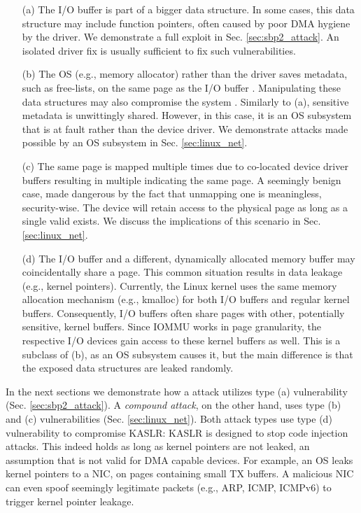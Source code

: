 \begin{enumerate}
    \item[(a)] The I/O buffer is part of a bigger data structure. In some cases, this data structure may include function pointers, often caused by poor DMA hygiene by the driver. We demonstrate a full exploit in Sec. \ref{sec:sbp2_attack}. An isolated driver fix is usually sufficient to fix such vulnerabilities.
    \item[(b)] The OS (e.g., memory allocator) rather than the driver saves metadata, such as free-lists, on the same page as the I/O buffer \cite{Cor07}. Manipulating these data structures may also compromise the system \cite{ak09}. Similarly to (a), sensitive metadata is unwittingly shared. However, in this case, it is an OS subsystem that is at fault rather than the device driver. We demonstrate attacks made possible by an OS subsystem in Sec. \ref{sec:linux_net}.
    \item[(c)] The same page is mapped multiple times due to co-located device driver buffers resulting in multiple \iova{} indicating the same page. A seemingly benign case, made dangerous by the fact that unmapping one \iova{} is meaningless, security-wise. The device will retain access to the physical page as long as a single valid \iova{} exists. We discuss the implications of this scenario in Sec. \ref{sec:linux_net}.
    \item[(d)] The I/O buffer and a different, dynamically allocated memory buffer may coincidentally share a page. This common situation results in data leakage (e.g., kernel pointers). Currently, the Linux kernel uses the same memory allocation mechanism (e.g., kmalloc) for both I/O buffers and regular kernel buffers. Consequently, I/O buffers often share pages with other, potentially sensitive, kernel buffers. Since IOMMU works in page granularity, the respective I/O devices gain access to these kernel buffers as well. This is a subclass of (b), as an OS subsystem causes it, but the main difference is that the exposed data structures are leaked randomly.

\end{enumerate}

In the next sections we demonstrate how a \simple{} attack utilizes type (a) vulnerability (Sec. \ref{sec:sbp2_attack}). A \emph{compound attack}, on the other hand, uses type (b) and (c) vulnerabilities (Sec. \ref{sec:linux_net}). Both attack types use type (d) vulnerability to compromise KASLR: KASLR is designed to stop code injection attacks. This indeed holds as long as kernel pointers are not leaked, an assumption that is not valid for DMA capable devices. For example, an OS leaks kernel pointers to a NIC, on pages containing small TX buffers. A malicious NIC can even spoof seemingly legitimate packets (e.g., ARP, ICMP, ICMPv6) to trigger kernel pointer leakage.


